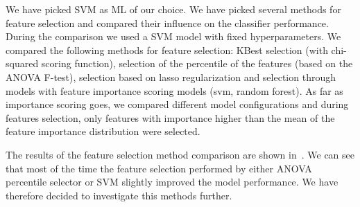 We have picked SVM as ML of our choice. We have picked several methods for feature
selection and compared their influence on the classifier performance. During the comparison
we used a SVM model with fixed hyperparameters. We compared the following methods for
feature selection: KBest selection (with chi-squared scoring function), selection of the percentile
of the features (based on the ANOVA F-test),
selection based on lasso regularization and selection through models with feature importance
scoring models (svm, random forest). As far as importance scoring goes, we compared different
model configurations and during features selection, only features with importance higher
than the mean of the feature importance distribution were selected.

The results of the feature selection method comparison are shown in~. We can see
that most of the time the feature selection performed by either ANOVA percentile selector or
SVM slightly improved the model performance. We have therefore decided to investigate this methods
further.

